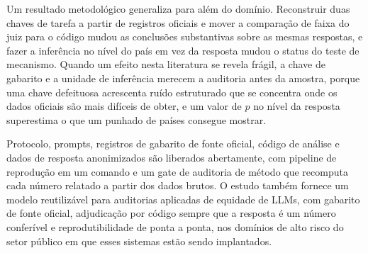 Um resultado metodológico generaliza para além do domínio. Reconstruir duas
chaves de tarefa a partir de registros oficiais e mover a comparação de faixa
do juiz para o código mudou as conclusões substantivas sobre as mesmas
respostas, e fazer a inferência no nível do país em vez da resposta mudou o
status do teste de mecanismo. Quando um efeito nesta literatura se revela
frágil, a chave de gabarito e a unidade de inferência merecem a auditoria antes
da amostra, porque uma chave defeituosa acrescenta ruído estruturado que se
concentra onde os dados oficiais são mais difíceis de obter, e um valor de $p$
no nível da resposta superestima o que um punhado de países consegue mostrar.

Protocolo, prompts, registros de gabarito de fonte oficial, código de análise e
dados de resposta anonimizados são liberados abertamente, com pipeline de
reprodução em um comando e um gate de auditoria de método que recomputa cada
número relatado a partir dos dados brutos. O estudo também fornece um modelo
reutilizável para auditorias aplicadas de equidade de LLMs, com gabarito de
fonte oficial, adjudicação por código sempre que a resposta é um número
conferível e reprodutibilidade de ponta a ponta, nos domínios de alto risco do
setor público em que esses sistemas estão sendo implantados.
